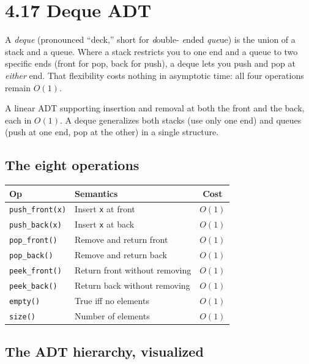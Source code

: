 \documentclass[11pt]{article}
\begin{document}
\section{4.17 Deque ADT}

A \emph{deque} (pronounced ``deck,'' short for \emph{d}ouble-
\emph{e}nded \emph{que}ue) is the union of a stack and a queue.
Where a stack restricts you to one end and a queue to two specific
ends (front for pop, back for push), a deque lets you push and pop
at \emph{either} end. That flexibility costs nothing in asymptotic
time: all four operations remain $O(1)$.

\begin{defnbox}[Deque]
A linear ADT supporting insertion and removal at both the front
and the back, each in $O(1)$. A deque generalizes both stacks
(use only one end) and queues (push at one end, pop at the other)
in a single structure.
\end{defnbox}

\subsection*{The eight operations}

\begin{center}
\begin{tabular}{|l|l|c|}
\hline
\textbf{Op} & \textbf{Semantics} & \textbf{Cost} \\
\hline
\texttt{push\_front(x)}  & Insert \texttt{x} at front       & $O(1)$ \\
\texttt{push\_back(x)}   & Insert \texttt{x} at back        & $O(1)$ \\
\texttt{pop\_front()}    & Remove and return front          & $O(1)$ \\
\texttt{pop\_back()}     & Remove and return back           & $O(1)$ \\
\texttt{peek\_front()}   & Return front without removing    & $O(1)$ \\
\texttt{peek\_back()}    & Return back without removing     & $O(1)$ \\
\texttt{empty()}         & True iff no elements             & $O(1)$ \\
\texttt{size()}          & Number of elements               & $O(1)$ \\
\hline
\end{tabular}
\end{center}

\subsection*{The ADT hierarchy, visualized}
\end{document}
